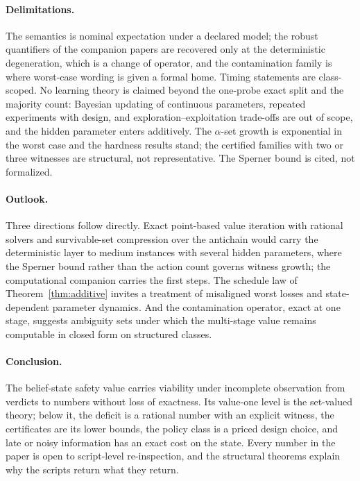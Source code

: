 \paragraph{Delimitations.}
The semantics is nominal expectation under a declared model; the robust quantifiers of the companion papers are recovered only at the deterministic degeneration, which is a change of operator, and the contamination family is where worst-case wording is given a formal home. Timing statements are class-scoped. No learning theory is claimed beyond the one-probe exact split and the majority count: Bayesian updating of continuous parameters, repeated experiments with design, and exploration--exploitation trade-offs are out of scope, and the hidden parameter enters additively. The $\alpha$-set growth is exponential in the worst case and the hardness results stand; the certified families with two or three witnesses are structural, not representative. The Sperner bound is cited, not formalized.

\paragraph{Outlook.}
Three directions follow directly. Exact point-based value iteration with rational solvers and survivable-set compression over the antichain would carry the deterministic layer to medium instances with several hidden parameters, where the Sperner bound rather than the action count governs witness growth; the computational companion \cite{Abaee2026cert} carries the first steps. The schedule law of Theorem~\ref{thm:additive} invites a treatment of misaligned worst losses and state-dependent parameter dynamics. And the contamination operator, exact at one stage, suggests ambiguity sets under which the multi-stage value remains computable in closed form on structured classes.

\paragraph{Conclusion.}
The belief-state safety value carries viability under incomplete observation from verdicts to numbers without loss of exactness. Its value-one level is the set-valued theory; below it, the deficit is a rational number with an explicit witness, the certificates are its lower bounds, the policy class is a priced design choice, and late or noisy information has an exact cost on the state. Every number in the paper is open to script-level re-inspection, and the structural theorems explain why the scripts return what they return.
